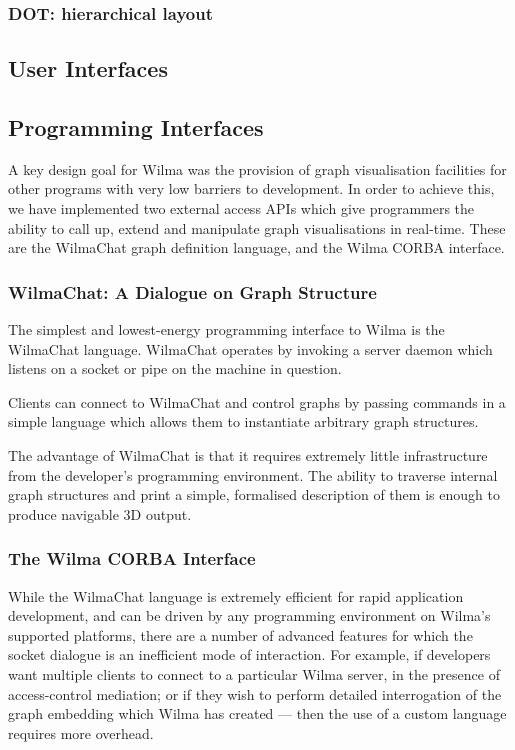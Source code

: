 \documentclass[runningheads]{cl2emult}
\begin{document}
\subsubsection{DOT: hierarchical layout}
\subsection{User Interfaces}
\subsection{Programming Interfaces}
\label{API}

A key design goal for Wilma was the provision of graph visualisation
facilities for other programs with very low barriers to development.  In order
to achieve this, we have implemented two external access APIs which give
programmers the ability to call up, extend and manipulate graph visualisations
in real-time.  These are the WilmaChat graph definition language, and the
Wilma CORBA interface.

\subsubsection{WilmaChat: A Dialogue on Graph Structure}

The simplest and lowest-energy programming interface to Wilma is the WilmaChat
language.  WilmaChat operates by invoking a server daemon which listens on a
socket or pipe on the machine in question.

Clients can connect to WilmaChat and control graphs by passing commands
in a simple language which allows them to instantiate arbitrary graph
structures.

The advantage of WilmaChat is that it requires extremely little infrastructure
from the developer's programming environment.  The ability to traverse
internal graph structures and print a simple, formalised description of them
is enough to produce navigable 3D output.

\subsubsection{The Wilma CORBA Interface}

While the WilmaChat language is extremely efficient for rapid application
development, and can be driven by any programming environment on Wilma's
supported platforms, there are a number of advanced features for which the
socket dialogue is an inefficient mode of interaction.  For example, if
developers want multiple clients to connect to a particular Wilma server, in
the presence of access-control mediation; or if they wish to perform detailed
interrogation of the graph embedding which Wilma has created --- then the use
of a custom language requires more overhead.
\end{document}
